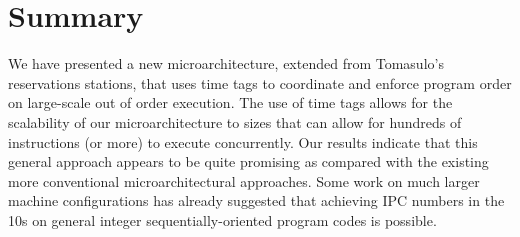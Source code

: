 \documentclass[10pt,twocolumn,dvips]{article}
\begin{document}
\section{Summary}
\vspace{-0.1in}
We have presented a new microarchitecture, extended from Tomasulo's
reservations stations, that uses time tags to coordinate and enforce
program order on large-scale out of order execution.
The use of time tags allows for the scalability of our microarchitecture
to sizes that can allow for hundreds of instructions (or more) to execute
concurrently.
Our results indicate that this general approach appears to be quite
promising as compared with the existing more conventional microarchitectural
approaches.  Some work on much larger machine configurations has already
suggested that achieving IPC numbers in the 10s on general integer
sequentially-oriented program codes is possible.
\vspace{-0.1in}


\end{document}
